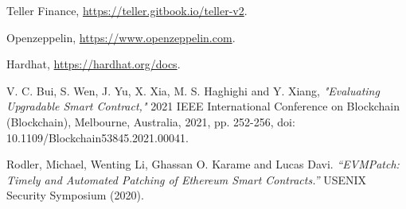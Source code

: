 \documentclass[english, LaM, oneside]{sapthesis}%
\begin{document}
\begin{thebibliography}{17}
Teller Finance, \url{https://teller.gitbook.io/teller-v2}.

Openzeppelin, \url{https://www.openzeppelin.com}.

Hardhat, \url{https://hardhat.org/docs}.

V. C. Bui, S. Wen, J. Yu, X. Xia, M. S. Haghighi and Y. Xiang, \textit{"Evaluating Upgradable Smart Contract,"} 2021 IEEE International Conference on Blockchain (Blockchain), Melbourne, Australia, 2021, pp. 252-256, doi: 10.1109/Blockchain53845.2021.00041.

Rodler, Michael, Wenting Li, Ghassan O. Karame and Lucas Davi. \textit{“EVMPatch: Timely and Automated Patching of Ethereum Smart Contracts.”} USENIX Security Symposium (2020).



\end{thebibliography}
\end{document}
